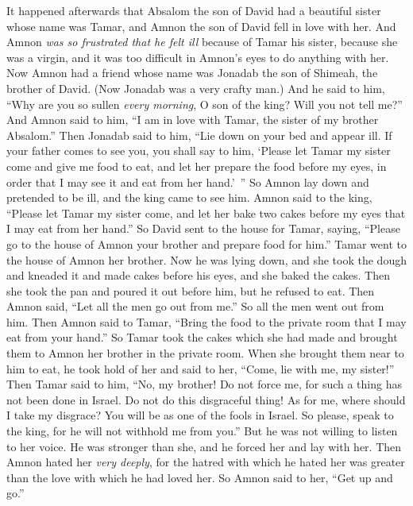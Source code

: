 \begin{biblechapter} %
 It happened afterwards that Absalom the son of David had a beautiful sister whose name was Tamar, and Amnon the son of David fell in love with her.
\verse And Amnon \textit{was so frustrated that he felt ill} because of Tamar his sister, because she was a virgin, and it was too difficult in Amnon’s eyes to do anything with her.
\verse Now Amnon had a friend whose name was Jonadab the son of Shimeah, the brother of David. (Now Jonadab was a very crafty man.)
\verse And he said to him, “Why are you so sullen \textit{every morning}, O son of the king? Will you not tell me?” And Amnon said to him, “I am in love with Tamar, the sister of my brother Absalom.”
\verse Then Jonadab said to him, “Lie down on your bed and appear ill. If your father comes to see you, you shall say to him, ‘Please let Tamar my sister come and give me food to eat, and let her prepare the food before my eyes, in order that I may see it and eat from her hand.’ ”
\verse So Amnon lay down and pretended to be ill, and the king came to see him. Amnon said to the king, “Please let Tamar my sister come, and let her bake two cakes before my eyes that I may eat from her hand.”
\verse So David sent to the house for Tamar, saying, “Please go to the house of Amnon your brother and prepare food for him.”
\verse Tamar went to the house of Amnon her brother. Now he was lying down, and she took the dough and kneaded it and made cakes before his eyes, and she baked the cakes.
\verse Then she took the pan and poured it out before him, but he refused to eat. Then Amnon said, “Let all the men go out from me.” So all the men went out from him.
\verse Then Amnon said to Tamar, “Bring the food to the private room that I may eat from your hand.” So Tamar took the cakes which she had made and brought them to Amnon her brother in the private room.
\verse When she brought them near to him to eat, he took hold of her and said to her, “Come, lie with me, my sister!”
\verse Then Tamar said to him, “No, my brother! Do not force me, for such a thing has not been done in Israel. Do not do this disgraceful thing!
\verse As for me, where should I take my disgrace? You will be as one of the fools in Israel. So please, speak to the king, for he will not withhold me from you.”
\verse But he was not willing to listen to her voice. He was stronger than she, and he forced her and lay with her.
\verse Then Amnon hated her \textit{very deeply}, for the hatred with which he hated her was greater than the love with which he had loved her. So Amnon said to her, “Get up and go.”

\end{biblechapter}
